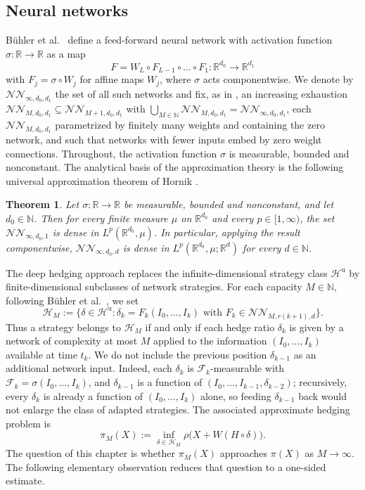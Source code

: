 \documentclass[11pt,a4paper]{report}
\numberwithin{equation}{chapter}
\theoremstyle{plain}
\newtheorem{theorem}[proposition]{Theorem}
\theoremstyle{definition}
\newcommand{\R}{\mathbb{R}}
\newcommand{\N}{\mathbb{N}}
\newcommand{\F}{\mathcal{F}}
\newcommand{\HH}{\mathcal{H}}
\newcommand{\Hu}{\mathcal{H}^{\mathrm{u}}}
\newcommand{\NNet}{\mathcal{N\!N}}
\begin{document}
\subsection*{Neural networks}

B\"uhler et al.\ \cite[Definition~2]{buehler} define a feed-forward
neural network with activation function $\sigma\colon\R\to\R$ as a map
\[
  F=W_L\circ F_{L-1}\circ\dots\circ F_1\colon\R^{d_0}\to\R^{d_1}
\]
with $F_j=\sigma\circ W_j$ for affine maps $W_j$, where $\sigma$ acts
componentwise. We denote by $\NNet_{\infty,d_0,d_1}$ the set of all
such networks and fix, as in \cite[Section~4.1]{buehler}, an increasing
exhaustion $\NNet_{M,d_0,d_1}\subseteq\NNet_{M+1,d_0,d_1}$ with
$\bigcup_{M\in\N}\NNet_{M,d_0,d_1}=\NNet_{\infty,d_0,d_1}$, each
$\NNet_{M,d_0,d_1}$ parametrized by finitely many weights and
containing the zero network, and such that networks with fewer inputs
embed by zero weight connections. Throughout, the activation function
$\sigma$ is measurable, bounded and nonconstant. The analytical basis
of the approximation theory is the following universal approximation
theorem of Hornik \cite[Theorem~1]{hornik}.

\begin{theorem}\label{thm:hornik}
  Let $\sigma\colon\R\to\R$ be measurable, bounded and nonconstant, and
  let $d_0\in\N$. Then for every finite measure $\mu$ on $\R^{d_0}$ and
  every $p\in[1,\infty)$, the set $\NNet_{\infty,d_0,1}$ is dense in
  $L^p(\R^{d_0},\mu)$. In particular, applying the result
  componentwise, $\NNet_{\infty,d_0,d}$ is dense in
  $L^p(\R^{d_0},\mu;\R^d)$ for every $d\in\N$.
\end{theorem}

\noindent
The deep hedging approach replaces the infinite-dimensional strategy
class $\Hu$ by finite-dimensional subclasses of network strategies. For
each capacity $M\in\N$, following B\"uhler et al.\
\cite[proof of Proposition~4.3]{buehler}, we set
\[
  \HH_M:=\bigl\{\delta\in\Hu:\delta_k=F_k(I_0,\dots,I_k)
  \text{ with }F_k\in\NNet_{M,r(k+1),d}\bigr\}.
\]
Thus a strategy belongs to $\HH_M$ if and only if each hedge ratio
$\delta_k$ is given by a network of complexity at most $M$ applied to
the information $(I_0,\dots,I_k)$ available at time $t_k$. We do not
include the previous position $\delta_{k-1}$ as an additional network
input. Indeed, each $\delta_k$ is $\F_k$-measurable with
$\F_k=\sigma(I_0,\dots,I_k)$, and $\delta_{k-1}$ is a function of
$(I_0,\dots,I_{k-1},\delta_{k-2})$; recursively, every $\delta_k$ is
already a function of $(I_0,\dots,I_k)$ alone, so feeding
$\delta_{k-1}$ back would not enlarge the class of adapted strategies.
The associated approximate hedging problem is
\begin{equation}\label{eq:piM}
  \pi_M(X):=\inf_{\delta\in\HH_M}\rho\bigl(X+W(H\circ\delta)\bigr).
\end{equation}
The question of this chapter is whether $\pi_M(X)$ approaches $\pi(X)$
as $M\to\infty$. The following elementary observation reduces that
question to a one-sided estimate.
\end{document}
